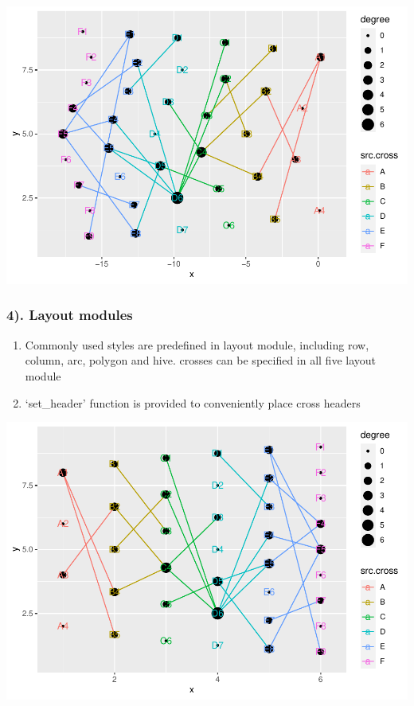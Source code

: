 \documentclass[
]{article}
\newenvironment{Shaded}{\begin{snugshade}}{\end{snugshade}}
\newcommand{\CommentTok}[1]{\textcolor[rgb]{0.56,0.35,0.01}{\textit{#1}}}
\newcommand{\KeywordTok}[1]{\textcolor[rgb]{0.13,0.29,0.53}{\textbf{#1}}}
\newcommand{\NormalTok}[1]{#1}
\newcommand{\OperatorTok}[1]{\textcolor[rgb]{0.81,0.36,0.00}{\textbf{#1}}}
\newcommand{\StringTok}[1]{\textcolor[rgb]{0.31,0.60,0.02}{#1}}
\providecommand{\tightlist}{%
  \setlength{\itemsep}{0pt}\setlength{\parskip}{0pt}}
\begin{document}
\includegraphics{ReadMe_files/figure-latex/unnamed-chunk-6-7.pdf}

\hypertarget{layout-modules}{%
\subsubsection{4). Layout modules}\label{layout-modules}}

\begin{enumerate}
\def\labelenumi{\alph{enumi}.}
\tightlist
\item
  Commonly used styles are predefined in layout module, including row,
  column, arc, polygon and hive. crosses can be specified in all five
  layout module
\item
  `set\_header' function is provided to conveniently place cross headers
\end{enumerate}

\begin{Shaded}
\end{Shaded}

\includegraphics{ReadMe_files/figure-latex/unnamed-chunk-7-1.pdf}
\end{document}
